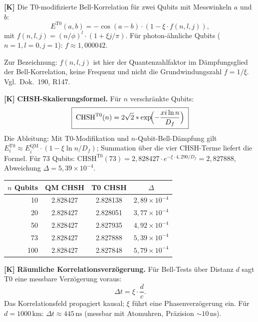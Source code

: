 \textbf{[K]} Die T0-modifizierte Bell-Korrelation für zwei Qubits mit Messwinkeln
$a$ und $b$:
\[
  E^{\text{T0}}(a,b) = -\cos(a-b)\cdot(1-\xi\cdot f(n,l,j)),
\]
mit $f(n,l,j)=(n/\phi)^l\cdot(1+\xi j/\pi)$. Für photon-ähnliche Qubits
($n=1,l=0,j=1$): $f\approx1{,}000042$.

Zur Bezeichnung: $f(n,l,j)$ ist hier der Quantenzahlfaktor im Dämpfungsglied
der Bell-Korrelation, keine Frequenz und nicht die Grundwindungszahl $f = 1/\xi$.
Vgl.\ Dok.~190, R147.

\textbf{[K]} \textbf{CHSH-Skalierungsformel.} Für $n$ verschränkte Qubits:
\[
  \boxed{\;\text{CHSH}^{\text{T0}}(n)
  = 2\sqrt2\cdot\exp\!\Bigl(-\frac{\xi\ln n}{D_f}\Bigr)\;}
\]
Die Ableitung: Mit T0-Modifikation und $n$-Qubit-Bell-Dämpfung gilt
$E_i^{\text{T0}}\approx E_i^{\text{QM}}\cdot(1-\xi\ln n/D_f)$; Summation über
die vier CHSH-Terme liefert die Formel. Für 73 Qubits:
$\text{CHSH}^{\text{T0}}(73) = 2{,}828427\cdot e^{-\xi\cdot4{,}290/D_f}
= 2{,}827888$, Abweichung $\Delta=5{,}39\times10^{-4}$.

\begin{center}
\renewcommand{\arraystretch}{1.3}
{\small
\begin{tabular}{rccc}
\toprule
$n$ Qubits & QM CHSH & T0 CHSH & $\Delta$ \\
\midrule
10  & 2.828427 & 2.828138 & $2{,}89\times10^{-4}$ \\
20  & 2.828427 & 2.828051 & $3{,}77\times10^{-4}$ \\
50  & 2.828427 & 2.827935 & $4{,}92\times10^{-4}$ \\
73  & 2.828427 & 2.827888 & $5{,}39\times10^{-4}$ \\
100 & 2.828427 & 2.827848 & $5{,}79\times10^{-4}$ \\
\bottomrule
\end{tabular}
}
\renewcommand{\arraystretch}{1.0}
\end{center}


\textbf{[K]} \textbf{Räumliche Korrelationsverzögerung.} Für Bell-Tests über Distanz
$d$ sagt T0 eine messbare Verzögerung voraus:
\[
  \Delta t = \xi\cdot\frac{d}{c}.
\]
Das Korrelationsfeld propagiert kausal; $\xi$ führt eine Phasenverzögerung ein.
Für $d=1000\,\text{km}$: $\Delta t\approx445\,\text{ns}$ (messbar mit Atomuhren,
Präzision $\sim10\,\text{ns}$).

